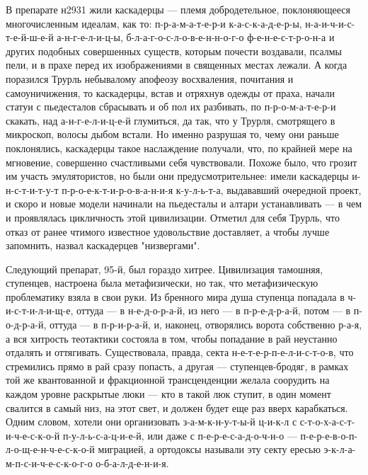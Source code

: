 В препарате н2931 жили каскадерцы --- племя добродетельное,
поклоняющееся многочисленным идеалам, как то:
п-р-а-м-а-т-е-р-и к-а-с-к-а-д-е-р-ы, н-а-и-ч-и-с-т-е-й-ш-е-й
а-н-г-е-л-и-ц-ы, б-л-а-г-о-с-л-о-в-е-н-н-о-г-о
ф-е-н-е-с-т-р-о-н-а и других подобных совершенных существ,
которым почести воздавали, псалмы пели, и в прахе перед их
изображениями в священных местах лежали. А когда поразился
Трурль небывалому апофеозу восхваления, почитания и
самоуничижения, то каскадерцы, встав и отряхнув одежды от
праха, начали статуи с пьедесталов сбрасывать и об пол их
разбивать, по п-р-о-м-а-т-е-р-и скакать, над
а-н-г-е-л-и-ц-е-й глумиться, да так, что у Трурля,
смотрящего в микроскоп, волосы дыбом встали. Но именно
разрушая то, чему они раньше поклонялись, каскадерцы такое
наслаждение получали, что, по крайней мере на мгновение,
совершенно счастливыми себя чувствовали. Похоже было, что
грозит им участь эмулятористов, но были они
предусмотрительнее: имели каскадерцы и-н-с-т-и-т-у-т
п-р-о-е-к-т-и-р-о-в-а-н-и-я к-у-л-ь-т-а, выдававший
очередной проект, и скоро и новые модели начинали на
пьедесталы и алтари устанавливать --- в чем и проявлялась
цикличность этой цивилизации. Отметил для себя Трурль, что
отказ от ранее чтимого известное удовольствие доставляет, а
чтобы лучше запомнить, назвал каскадерцев "низвергами".

Следующий препарат, 95-й, был гораздо хитрее. Цивилизация
тамошняя, ступенцев, настроена была метафизически, но так,
что метафизическую проблематику взяла в свои руки. Из
бренного мира душа ступенца попадала в ч-и-с-т-и-л-и-щ-е,
оттуда --- в н-е-д-о-р-а-й, из него --- в п-р-е-д-р-а-й, потом --- в
п-о-д-р-а-й, оттуда --- в п-р-и-р-а-й, и, наконец,
отворялись ворота собственно р-а-я, а вся хитрость
теотактики состояла в том, чтобы попадание в рай неустанно
отдалять и оттягивать. Существовала, правда, секта
н-е-т-е-р-п-е-л-и-с-т-о-в, что стремились прямо в рай сразу
попасть, а другая --- ступенцев-бродяг, в рамках той же
квантованной и фракционной трансценденции желала соорудить
на каждом уровне раскрытые люки --- кто в такой люк ступит, в
один момент свалится в самый низ, на этот свет, и должен
будет еще раз вверх карабкаться. Одним словом, хотели они
организовать з-а-м-к-н-у-т-ы-й ц-и-к-л с
с-т-о-х-а-с-т-и-ч-е-с-к-о-й п-у-л-ь-с-а-ц-и-е-й, или даже с
п-е-р-е-с-а-д-о-ч-н-о --- п-е-р-е-в-о-п-л-о-щ-е-н-ч-е-с-к-о-й
миграцией, а ортодоксы называли эту секту ересью
э-к-л-а-м-п-с-и-ч-е-с-к-о-г-о о-б-а-л-д-е-н-и-я.


